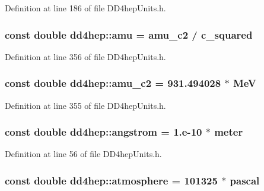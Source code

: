 Definition at line 186 of file DD4hepUnits.h.\hypertarget{namespacedd4hep_a0b45315a57cae4bbe7083252cd13f6e8}{
\subsubsection[{amu}]{\setlength{\rightskip}{0pt plus 5cm}const double {\bf dd4hep::amu} = {\bf amu\_\-c2} / {\bf c\_\-squared}}}
\label{namespacedd4hep_a0b45315a57cae4bbe7083252cd13f6e8}


Definition at line 356 of file DD4hepUnits.h.\hypertarget{namespacedd4hep_a6bf5b89f5cde619efc44b8b11104932f}{
\subsubsection[{amu\_\-c2}]{\setlength{\rightskip}{0pt plus 5cm}const double {\bf dd4hep::amu\_\-c2} = 931.494028 $\ast$ {\bf MeV}}}
\label{namespacedd4hep_a6bf5b89f5cde619efc44b8b11104932f}


Definition at line 355 of file DD4hepUnits.h.\hypertarget{namespacedd4hep_a82387b0906ee031cb7ef93723f99c474}{
\subsubsection[{angstrom}]{\setlength{\rightskip}{0pt plus 5cm}const double {\bf dd4hep::angstrom} = 1.e-\/10 $\ast$ {\bf meter}}}
\label{namespacedd4hep_a82387b0906ee031cb7ef93723f99c474}


Definition at line 56 of file DD4hepUnits.h.\hypertarget{namespacedd4hep_a3907dd93dc8fc5b2f3b0fb9b92e46c5b}{
\subsubsection[{atmosphere}]{\setlength{\rightskip}{0pt plus 5cm}const double {\bf dd4hep::atmosphere} = 101325 $\ast$ pascal}}
\label{namespacedd4hep_a3907dd93dc8fc5b2f3b0fb9b92e46c5b}


